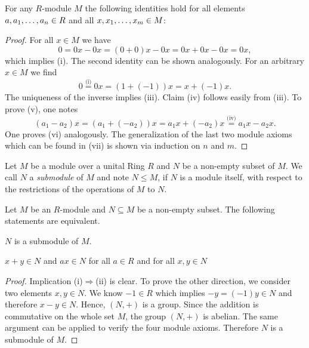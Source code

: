 \begin{lem}\label{lm.basicProp}For any $R$-module $M$ the following identities hold for all elements $a,\seq{a}\in R$ and all $x,\seq[m]{x}\in M$:
\begin{multienumerate}
\end{multienumerate} 
\end{lem}
\begin{proof}
For all $x\in M$ we have
\begin{equation*}
0=0x-0x=(0+0)x-0x=0x+0x-0x=0x,
\end{equation*}
which implies (i). The second identity can be shown analogously. For an arbitrary $x\in M$ we find 
\begin{equation*}
0\overset{\text{(i)}}{=}0x=(1+(-1))x=x+(-1)x.
\end{equation*}
The uniqueness of the inverse implies (iii). Claim (iv) follows easily from (iii). To prove (v), one notes
\begin{equation*} 
(a_1-a_2)x=(a_1+(-a_2))x=a_1x+(-a_2)x\overset{\text{(iv)}}{=}a_1x-a_2x.
\end{equation*}
One proves (vi) analogously. The generalization of the last two module axioms which can be found in (vii) is shown via induction on $n$ and $m$.
\end{proof}

\begin{defin}Let $M$ be a module over a unital Ring $R$ and $N$ be a non-empty subset of $M$. We call $N$ a \emph{submodule} of $M$ and note $N\leq M$, if $N$ is a module itself, with respect to the restrictions of the operations of $M$ to $N$.
\end{defin}  

\begin{lem}\label{lm.SubMod}
Let $M$ be an $R$-module and $N\subseteq M$ be a non-empty subset. The following statements are equivalent.
\begin{thmlist}
\item $N$ is a submodule of $M$.
\item $x+y\in N$ and $ax\in N$ for all $a\in R$ and for all $x,y\in N$
\end{thmlist}
\end{lem}
\begin{proof}
Implication (i)$\Rightarrow$(ii) is clear. To prove the other direction, we consider two elements $x,y\in N$. We know $-1\in R$ which implies $-y=(-1)y\in N$ and therefore $x-y\in N$. Hence, $(N,+)$ is a group. Since the addition is commutative on the whole set $M$, the group $(N,+)$ is abelian. The same argument can be applied to verify the four module axioms. Therefore $N$ is a submodule of $M$. 
\end{proof}


